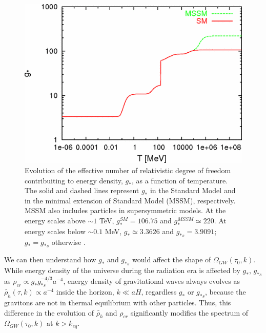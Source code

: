 \documentclass[11pt,a4paper,twoside]{book}
\begin{document}
\begin{figure}
	\centering
	\includegraphics[width=0.7\linewidth, height=0.25\textheight]{Images/Chap3/Watanabe_Komatsu_Fig2}
	\caption{Evolution of the effective number of relativistic degree of freedom contribuiting to energy density, $ g_{*} $, as a function of temperature. The solid and dashed lines represent  $ g_{*} $ in the Standard Model and in the minimal extension of Standard Model (MSSM), respectively. MSSM also includes particles in supersymmetric models. At the energy scales above $ \sim 1$ TeV, $ g_{*}^{SM}=106.75 $ and $ g_{*}^{MSSM} \simeq 220 $. At energy scales below $ \sim 0.1 $ MeV, $ g_{*}\simeq 3.3626 $ and $ g_{*s}=3.9091 $; $ g_{*}=g_{*s} $ otherwise \cite{Chap3:GW_Watanabe_Komatsu}. }
	\label{fig:watanabekomatsufig2}
\end{figure}

We can then understand how $ g_{*} $ and $ g_{*s} $ would affect the shape of $ \Omega_{GW}(\tau_{0},k) $. While energy density of the universe  during the radiation era is affected by $ g_{*} $, $ g_{*s} $ as $ \rho_{cr} \propto g_{*}g_{*s}^{-4/3}a^{-4} $, energy density of  gravitational waves always evolves as $\tilde{\rho_{h}}(\tau,k) \propto a^{-4}$ inside the horizon, $ k \ll aH $, regardless $ g_{*} $ or $ g_{*s} $, because the gravitons are not in thermal equilibrium with other particles. Thus, this difference in the evolution of $ \tilde{\rho_{h}} $ and $ \rho_{cr} $ significantly modifies the spectrum of $ \Omega_{GW}(\tau_{0},k) $ at $ k>k_{eq} $.
\end{document}
